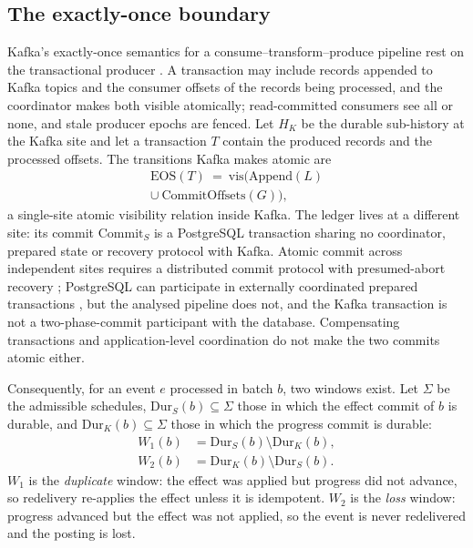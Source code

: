 \subsection{The exactly-once boundary}
\label{sec:model:eos}

Kafka's exactly-once semantics for a consume--transform--produce pipeline rest on the
transactional producer \cite{kip98,kip447,kafka-design}. A transaction may include records
appended to Kafka topics and the consumer offsets of the records being processed, and the
coordinator makes both visible atomically; read-committed consumers see all or none, and stale
producer epochs are fenced. Let $H_K$ be the durable sub-history at the Kafka site and let a
transaction $T$ contain the produced records and the processed offsets. The transitions Kafka
makes atomic are
\begin{multline}
\mathrm{EOS}(T)\ =\ \mathrm{vis}\big(\mathrm{Append}(L)\\
\cup\ \mathrm{CommitOffsets}(G)\big),
\label{eq:eos}
\end{multline}
a single-site atomic visibility relation inside Kafka. The ledger lives at a different site: its
commit $\mathrm{Commit}_{S}$ is a PostgreSQL transaction sharing no coordinator, prepared state or
recovery protocol with Kafka. Atomic commit across independent sites requires a distributed
commit protocol with presumed-abort recovery \cite{txncommit2006}; PostgreSQL can participate in
externally coordinated prepared transactions \cite{pg-prepare}, but the analysed pipeline does
not, and the Kafka transaction is not a two-phase-commit participant with the database.
Compensating transactions \cite{sagas1987} and application-level coordination
\cite{laigner2021,micro2026} do not make the two commits atomic either.

Consequently, for an event $e$ processed in batch $b$, two windows exist. Let $\Sigma$ be the
admissible schedules, $\mathrm{Dur}_S(b)\subseteq\Sigma$ those in which the effect commit of $b$
is durable, and $\mathrm{Dur}_K(b)\subseteq\Sigma$ those in which the progress commit is durable:
\begin{align}
W_1(b) &= \mathrm{Dur}_S(b)\setminus\mathrm{Dur}_K(b), \label{eq:w1}\\
W_2(b) &= \mathrm{Dur}_K(b)\setminus\mathrm{Dur}_S(b). \label{eq:w2}
\end{align}
$W_1$ is the \emph{duplicate} window: the effect was applied but progress did not advance, so
redelivery re-applies the effect unless it is idempotent. $W_2$ is the \emph{loss} window:
progress advanced but the effect was not applied, so the event is never redelivered and the
posting is lost.

